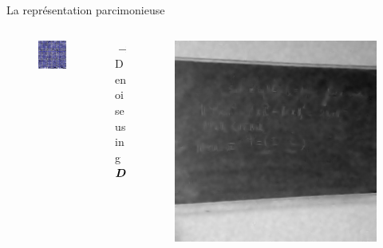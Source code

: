 \begin{frame}{La représentation parcimonieuse}
\begin{itemize}
\begin{columns}
\begin{column}{0.30\textwidth}
\begin{figure}
		\includegraphics[width=\textwidth]{figures/exple-denoise/dict_ksvd.jpg}
	\end{figure} \end{column}
	\begin{column}{0.12\textwidth} \centering
		$\rightarrow$\\
		Denoise \\
		using\\
		$\bm{D}$
	\end{column}
	\begin{column}{0.30\textwidth} \begin{figure}\centering
		\includegraphics[width=\textwidth]{figures/exple-denoise/denoised_ksvd.jpg}

\end{figure}
\end{column}
\end{columns}
\end{itemize}
\end{frame}
